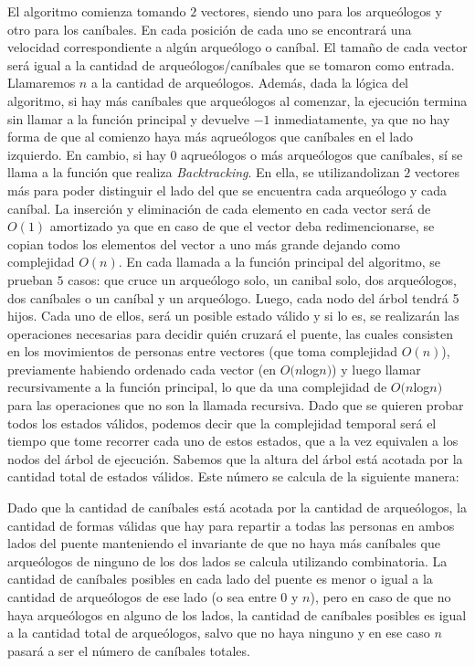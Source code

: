       El algoritmo comienza tomando $2$ vectores, siendo uno para los arqueólogos y otro para los caníbales. En cada posición de cada uno se encontrará una velocidad correspondiente a algún arqueólogo o caníbal. El tamaño de cada vector será igual a la cantidad de arqueólogos/caníbales que se tomaron como entrada. Llamaremos $n$ a la cantidad de arqueólogos. Además, dada la lógica del algoritmo, si hay más caníbales que arqueólogos al comenzar, la ejecución termina sin llamar a la función principal y devuelve $-1$ inmediatamente, ya que no hay forma de que al comienzo haya más aqrueólogos que caníbales en el lado izquierdo. En cambio, si hay $0$ aqrueólogos o más arqueólogos que caníbales, sí se llama a la función que realiza \emph{Backtracking}.
      En ella, se utilizandolizan $2$ vectores más para poder distinguir el lado del que se encuentra cada arqueólogo y cada caníbal. La inserción y eliminación de cada elemento en cada vector será de $O(1)$ amortizado ya que en caso de que el vector deba redimencionarse, se copian todos los elementos del vector a uno más grande dejando como complejidad $O(n)$.
      En cada llamada a la función principal del algoritmo, se prueban $5$ casos: que cruce un arqueólogo solo, un canibal solo, dos arqueólogos, dos caníbales o un caníbal y un arqueólogo. Luego, cada nodo del árbol tendrá 5 hijos. Cada uno de ellos, será un posible estado válido y si lo es, se realizarán las operaciones necesarias para decidir quién cruzará el puente, las cuales consisten en los movimientos de personas entre vectores (que toma complejidad $O(n)$), previamente habiendo ordenado cada vector (en $O(n $log$ n)$) y luego llamar recursivamente a la función principal, lo que da una complejidad de $O(n $log$ n)$ para las operaciones que no son la llamada recursiva. Dado que se quieren probar todos los estados válidos, podemos decir que la complejidad temporal será el tiempo que tome recorrer cada uno de estos estados, que a la vez equivalen a los nodos del árbol de ejecución. Sabemos que la altura del árbol está acotada por la cantidad total de estados válidos. Este número se calcula de la siguiente manera:

      Dado que la cantidad de caníbales está acotada por la cantidad de arqueólogos, la cantidad de formas válidas que hay para repartir a todas las personas en ambos lados del puente manteniendo el invariante de que no haya más caníbales que arqueólogos de ninguno de los dos lados se calcula utilizando combinatoria. La cantidad de caníbales posibles en cada lado del puente es menor o igual a la cantidad de arqueólogos de ese lado (o sea entre $0$ y $n$), pero en caso de que no haya arqueólogos en alguno de los lados, la cantidad de caníbales posibles es igual a la cantidad total de arqueólogos, salvo que no haya ninguno y en ese caso $n$ pasará a ser el número de caníbales totales.

